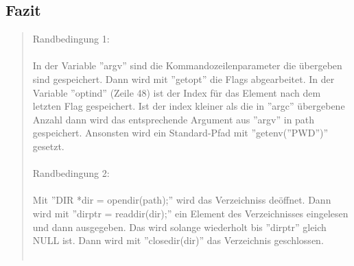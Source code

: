 	\subsection{Fazit}
		\begin{quote}
			Randbedingung 1:\\ \\
			\tiny
			In der Variable ''argv'' sind  die Kommandozeilenparameter die \"ubergeben sind gespeichert. Dann wird mit ''getopt'' die Flags abgearbeitet. In der Variable ''optind'' (Zeile 48) ist der Index f\"ur das Element nach dem letzten Flag gespeichert.  Ist der index kleiner als die in ''argc'' \"ubergebene Anzahl dann wird das entsprechende Argument aus ''argv'' in path gespeichert. Ansonsten wird ein Standard-Pfad mit ''getenv(''PWD'')'' gesetzt.\\ \\
			
			Randbedingung 2:\\ \\
			\tiny
			Mit ''DIR *dir = opendir(path);'' wird das Verzeichniss de\"offnet. Dann wird mit ''dirptr = readdir(dir);'' ein Element des Verzeichnisses eingelesen und dann ausgegeben. Das  wird solange wiederholt bis ''dirptr'' gleich NULL ist. Dann wird mit ''closedir(dir)'' das Verzeichnis geschlossen.\\ \\
			

\end{quote}
